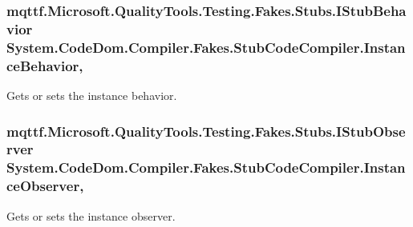 \hypertarget{class_system_1_1_code_dom_1_1_compiler_1_1_fakes_1_1_stub_code_compiler_afc4f25f9923ad9decf9b461e85ad239a}{
\subsubsection[{Instance\-Behavior}]{\setlength{\rightskip}{0pt plus 5cm}mqttf.\-Microsoft.\-Quality\-Tools.\-Testing.\-Fakes.\-Stubs.\-I\-Stub\-Behavior System.\-Code\-Dom.\-Compiler.\-Fakes.\-Stub\-Code\-Compiler.\-Instance\-Behavior\hspace{0.3cm}{\ttfamily [get]}, {\ttfamily [set]}}}\label{class_system_1_1_code_dom_1_1_compiler_1_1_fakes_1_1_stub_code_compiler_afc4f25f9923ad9decf9b461e85ad239a}


Gets or sets the instance behavior.

\hypertarget{class_system_1_1_code_dom_1_1_compiler_1_1_fakes_1_1_stub_code_compiler_a34e1a6cbdea425ed5d6ef98bcecc5088}{
\subsubsection[{Instance\-Observer}]{\setlength{\rightskip}{0pt plus 5cm}mqttf.\-Microsoft.\-Quality\-Tools.\-Testing.\-Fakes.\-Stubs.\-I\-Stub\-Observer System.\-Code\-Dom.\-Compiler.\-Fakes.\-Stub\-Code\-Compiler.\-Instance\-Observer\hspace{0.3cm}{\ttfamily [get]}, {\ttfamily [set]}}}\label{class_system_1_1_code_dom_1_1_compiler_1_1_fakes_1_1_stub_code_compiler_a34e1a6cbdea425ed5d6ef98bcecc5088}


Gets or sets the instance observer.

